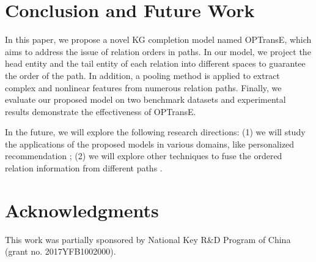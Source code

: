 \documentclass[11pt,a4paper]{article}
\begin{document}
\section{Conclusion and Future Work}

In this paper, we propose a novel KG completion model named
OPTransE, which aims to address the issue of relation orders in
paths. In our model, we project the head entity and the tail entity
of each relation into different spaces to guarantee the order of the
path. In addition, a pooling method is applied to extract complex
and nonlinear features from numerous relation paths. Finally, we
evaluate our proposed model on two benchmark datasets and
experimental results demonstrate the effectiveness of OPTransE.

In the future, we will explore the following research directions:
(1) we will study the applications of the proposed models in various
domains, like personalized recommendation \cite{liu2018cplr}; (2) we will explore other
techniques to fuse the ordered relation information from different
paths \cite{liu2019aem}.


\section*{Acknowledgments}

This work was partially sponsored by National Key R{\&}D Program of China (grant no. 2017YFB1002000).



\end{document}
